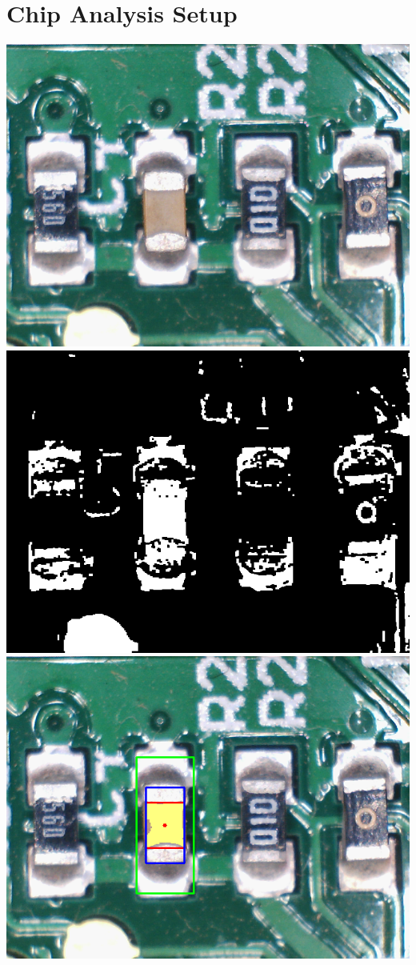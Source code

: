 \documentclass[12pt]{article}
\begin{document}
\section{Chip Analysis Setup}
\includegraphics{images/Segmentation/raw_image.png}
\includegraphics{images/Segmentation/binary.png}
\includegraphics{images/Segmentation/part_analysis.png}
\end{document}
